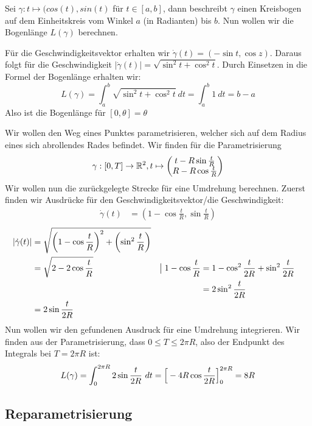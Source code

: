 \begin{example}[Kreisbogen] Sei $\gamma: t \mapsto (cos(t), sin(t)$ für $t\in [a,b]$, dann beschreibt $\gamma$ einen Kreisbogen auf dem Einheitskreis vom Winkel $a$ (in Radianten) bis $b$.
Nun wollen wir die Bogenlänge $L(\gamma)$ berechnen.

Für die Geschwindigkeitsvektor erhalten wir $\dot{\gamma}(t) = (-\sin t, \cos z)$. Daraus folgt für die Geschwindigkeit $|\dot{\gamma}(t)| = \sqrt{\sin^2 t + \cos^2 t}$. Durch Einsetzen in die Formel der Bogenlänge erhalten wir:
$$L(\gamma) =  \int_a^b \sqrt{\sin^2 t + \cos^2 t} \ dt =\int_a^b 1 \ dt = b-a$$
Also ist die Bogenlänge für $[0, \theta] = \theta$
\end{example}
\begin{example}[Zykloide] Wir wollen den Weg eines Punktes parametrisieren, welcher sich auf dem Radius eines sich abrollendes Rades befindet. Wir finden für die Parametrisierung
$$\gamma: [0, T]\to \mathbb{R}^2, t\mapsto \begin{pmatrix}
  t-R\sin \frac{t}{R}\\
  R-R\cos \frac{t}{R}
\end{pmatrix}$$
Wir wollen nun die zurückgelegte Strecke für eine Umdrehung berechnen. Zuerst finden wir Ausdrücke für den Geschwindigkeitsvektor/die Geschwindigkeit:
\begin{align*}
    \dot{\gamma}(t) &= \left(1-\cos \frac{t}{R}, \sin \frac{t}{R}\right)
\end{align*}
\begin{align*}
    |\dot{\gamma}(t)| &= \sqrt{\left(1-\cos \frac{t}{R}\right)^2+\left(\sin^2 \frac{t}{R}\right)}&\\
    &= \sqrt{2- 2\cos \frac{t}{R}}& \bigm\vert 1-\cos \frac{t}{R} &= 1 - \cos^2\frac{t}{2R} + \sin^2\frac{t}{2R}\\
    &&&= 2 \sin^2\frac{t}{2R}\\
    &=2 \sin\frac{t}{2R}\\
\end{align*}
Nun wollen wir den gefundenen Ausdruck für eine Umdrehung integrieren. Wir finden aus der Parametrisierung, dass $0\leq T \leq 2\pi R$, also der Endpunkt des Integrals bei $T = 2\pi R$ ist:
$$L(\gamma) = \int_0^{2\pi R}2 \sin\frac{t}{2R} \ dt = \Big[-4R\cos \frac{t}{2R}\Big]^{2\pi R}_0=8R\\$$
\end{example}
\subsection{Reparametrisierung}\label{cha_reparametrisierung}
